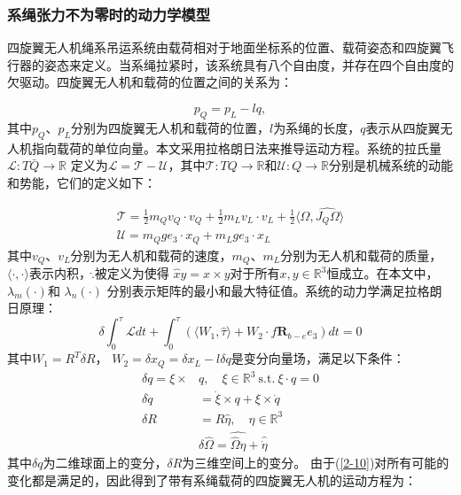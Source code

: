 \documentclass[lang=chs, degree=master, blindreview=false, winfonts=true]{yanputhesis}
\begin{document}
\subsubsection{系绳张力不为零时的动力学模型}

四旋翼无人机绳系吊运系统由载荷相对于地面坐标系的位置、载荷姿态和四旋翼飞行器的姿态来定义。当系绳拉紧时，该系统具有八个自由度，并存在四个自由度的欠驱动。四旋翼无人机和载荷的位置之间的关系为：

\begin{equation}
	p_Q=p_L-lq,
\end{equation}
其中$p_Q$、$p_L$分别为四旋翼无人机和载荷的位置，$l$为系绳的长度，$q$表示从四旋翼无人机指向载荷的单位向量。本文采用拉格朗日法来推导运动方程。系统的拉氏量 $\mathcal{L}:T\bar{Q}\to\mathbb{R}$ 定义为$\mathcal{L}=\mathcal{T}-\mathcal{U}$，其中$\mathcal{T}:TQ\to\mathbb{R}$和${\mathcal{U}}:Q\to\mathbb{R}$分别是机械系统的动能和势能，它们的定义如下：

\begin{equation}
		\begin{aligned}
	\mathcal{T}=\frac{1}{2}m_{Q}v_{Q}\cdot v_{Q}+\frac{1}{2}m_{L}v_{L}\cdot v_{L}+\frac{1}{2}\langle\hat{\Omega},\widehat{J_{Q}\Omega}\rangle\\
	\mathcal{U}=m_{Q}ge_{3}\cdot x_{Q}+m_{L}ge_{3}\cdot x_{L}
		\end{aligned}
	\label{2-8}
\end{equation}
其中$v_Q$、$v_L$分别为无人机和载荷的速度，$m_Q$、$m_L$分别为无人机和载荷的质量，$\langle\cdot,\cdot\rangle $表示内积，$\hat{.}$被定义为使得 $\hat{x}y=x\times y$对于所有$x,y\in\mathbb{R}^3$恒成立。在本文中，$\lambda_m(\cdot)$和 $\lambda_n(\cdot)$ 分别表示矩阵的最小和最大特征值。系统的动力学满足拉格朗日原理：
\begin{equation}
	\delta\int_0^\tau\mathcal{L} dt+\int_0^\tau\left(\langle W_1,\hat{\tau}\rangle+W_2\cdot f\bm{R}_{b-e}e_3\right) dt=0
	\label{2-10}
\end{equation}
其中$W_{1}=R^{T}\delta R$， $ W_{2}=\delta x_{Q}=\delta x_{L}-l\delta q$是变分向量场，满足以下条件：
\begin{equation}
	\begin{aligned}
		\delta q = \xi \times& q, \quad \xi \in \mathbb{R}^{3} \ \mathrm{s.t.} \ \xi \cdot q = 0 \\
		\delta \dot{q} &= \dot{\xi} \times q + \xi \times \dot{q} \\
		\delta R& = R \hat{\eta}, \quad \eta \in \mathbb{R}^{3} \\
		&\delta \hat{\Omega} = \widehat{\hat{\Omega} \eta} + \hat{\dot{\eta}}
	\end{aligned}
\end{equation}
其中$\delta q$为二维球面上的变分，$\delta R$为三维空间上的变分。
由于(\ref{2-10})对所有可能的变化都是满足的，因此得到了带有系绳载荷的四旋翼无人机的运动方程为：
\end{document}
